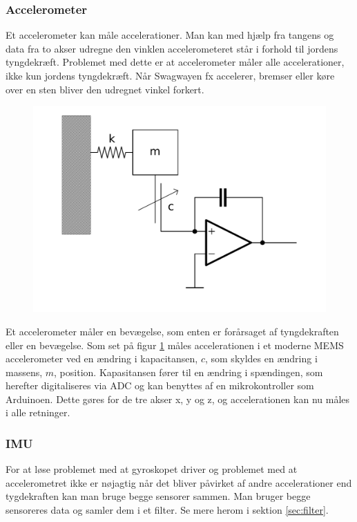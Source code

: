 \documentclass[a4paper,oneside,article,danish,table]{memoir}
\begin{document}
\subsubsection{Accelerometer}
Et accelerometer kan måle accelerationer. Man kan med hjælp fra tangens og data fra to akser udregne den vinklen accelerometeret står i forhold til jordens tyngdekræft. Problemet med dette er at accelerometer måler alle accelerationer, ikke kun jordens tyngdekræft. Når Swagwayen fx accelerer, bremser eller køre over en sten bliver den udregnet vinkel forkert.
\begin{figure}[htbp]
  \centering
  \includegraphics[width=\textwidth]{pictures/accbasic.pdf}
  \label{fig:memsacc}
\end{figure}
Et accelerometer måler en bevægelse, som enten er forårsaget af tyngdekraften eller en bevægelse. Som set på figur \ref{fig:memsacc} måles accelerationen i et moderne MEMS accelerometer ved en ændring i kapacitansen, $c$, som skyldes en ændring i massens, $m$, position. Kapasitansen fører til en ændring i spændingen, som herefter digitaliseres via ADC og kan benyttes af en mikrokontroller som Arduinoen. Dette gøres for de tre akser x, y og z, og accelerationen kan nu måles i alle retninger.

\subsubsection{IMU}
For at løse problemet med at gyroskopet driver og problemet med at accelerometret ikke er nøjagtig når det bliver påvirket af andre accelerationer end tygdekraften kan man bruge begge sensorer sammen. Man bruger begge sensoreres data og samler dem i et filter. Se mere herom i sektion \ref{sec:filter}.
\end{document}
